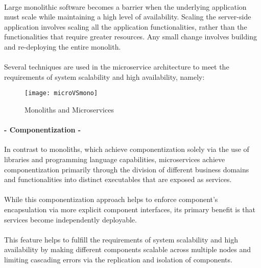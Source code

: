 \paragraph{}

Large monolithic software becomes a barrier when the underlying application must scale while maintaining a high level of availability.
Scaling the server-side application involves scaling all the application functionalities, rather than the functionalities that require greater resources.
Any small change involves building and re-deploying the entire monolith.

\paragraph{}

Several techniques are used in the microservice architecture to meet the requirements of system scalability and high availability, namely:

\begin{figure}[htbp]
    \centering
    \texttt{[image: microVSmono]}
    \caption{Monoliths and Microservices \cite{microservices}}
    \label{fig:monoliths and microservices}
\end{figure}

\paragraph{- Componentization -}

In contrast to monoliths, which achieve componentization solely via the use of libraries and programming language capabilities,
microservices achieve componentization primarily through the division of different business domains and functionalities into distinct executables
that are exposed as services.

\paragraph{}

While this componentization approach helps to enforce component's encapsulation via more explicit component interfaces,
its primary benefit is that services become independently deployable.

\paragraph{}

This feature helps to fulfill the requirements of system scalability and high availability by
making different components scalable across multiple nodes and limiting cascading errors via the replication and isolation of components.


